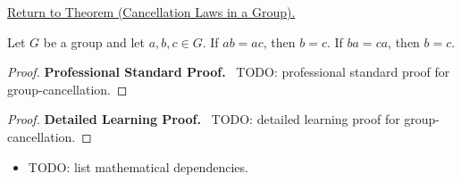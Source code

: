 \newpage
{}
\label{prf:group-cancellation}

\begin{remark*}[Return]
\hyperref[prop:group-cancellation]{Return to Theorem (Cancellation Laws in a Group).}
\end{remark*}

\begin{theorem*}
Let $G$ be a group and let $a,b,c \in G$.
If $ab = ac$, then $b=c$.
If $ba = ca$, then $b=c$.
\end{theorem*}

\begin{proof}
\textbf{Professional Standard Proof.}~
TODO: professional standard proof for group-cancellation.
\end{proof}

\begin{proof}
\textbf{Detailed Learning Proof.}~
TODO: detailed learning proof for group-cancellation.
\end{proof}

\begin{remark*}
\end{remark*}

\begin{dependencies}
\begin{itemize}
  \item TODO: list mathematical dependencies.
\end{itemize}
\end{dependencies}

\clearpage
